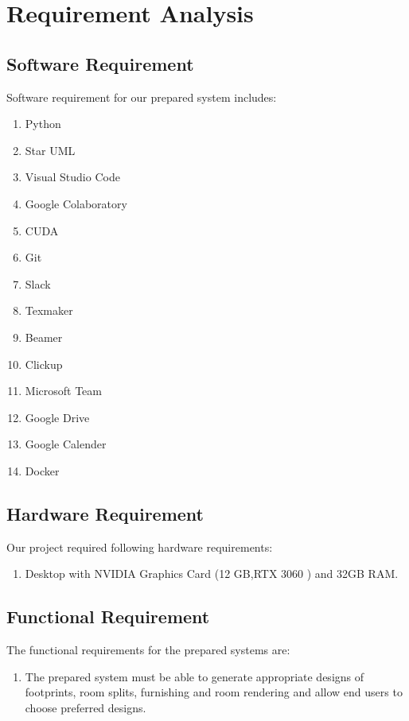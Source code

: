       \chapter{Requirement Analysis}
        \section{Software Requirement}
            Software requirement for our prepared system includes:
            \begin{enumerate}
                \item Python
                \item Star UML
                \item Visual Studio Code
                \item Google Colaboratory
                \item CUDA
                \item Git
	            \item Slack
                \item Texmaker
                \item Beamer
                \item Clickup
                \item Microsoft Team
                \item Google Drive
                \item Google Calender
                \item Docker
            \end{enumerate}
                
         \section{Hardware Requirement}
            Our project required following hardware requirements:
            \begin{enumerate}
                \item Desktop with NVIDIA Graphics Card (12 GB,RTX 3060 ) and 32GB RAM.
            \end{enumerate}
            
        \section{Functional Requirement}
            The functional requirements for the prepared systems are:
            \begin{enumerate}
                \item The prepared system must be able to generate appropriate designs of footprints, room splits, furnishing and room rendering and allow end users to choose preferred designs.
            \end{enumerate}

